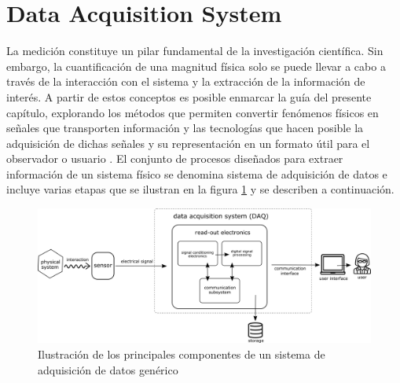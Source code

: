 \documentclass[]{book}
\begin{document}

\chapter*{Data Acquisition System }

\noindent La medición constituye un pilar fundamental de la investigación científica. Sin embargo, la cuantificación de una magnitud física solo se puede llevar a cabo a través de la interacción con el sistema y la extracción de la información de interés. A partir de estos conceptos es posible enmarcar la guía del presente capítulo, explorando los métodos que permiten convertir fenómenos físicos en señales que transporten información y las tecnologías que hacen posible la adquisición de dichas señales y su representación en un formato útil para el observador o  usuario \cite{webster2018measurement}. El conjunto de procesos diseñados para extraer información de un sistema físico se denomina sistema de adquisición de datos e incluye varias etapas que se ilustran en la figura \ref{fig:DAQ_generic} y se describen a continuación.\\

\begin{figure}[h]
    \centering
    \includegraphics[width=1.0\textwidth]{DAQ_chain.png}
    \caption{Ilustración de los principales componentes de un sistema de adquisición de datos genérico}
    \label{fig:DAQ_generic}

\end{figure}
\end{document}
